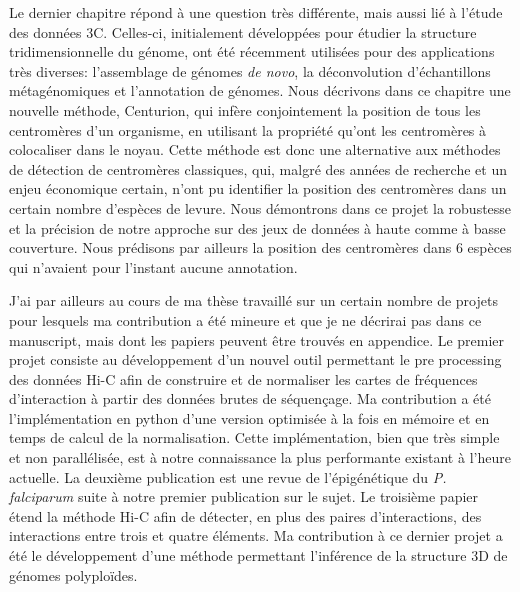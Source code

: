 \begin{resumes}
Le dernier chapitre répond à une question très différente, mais aussi lié à
l'étude des données 3C. Celles-ci, initialement développées pour étudier la
structure tridimensionnelle du génome, ont été récemment utilisées pour des
applications très diverses: l'assemblage de génomes {\em de novo}, la
déconvolution d'échantillons métagénomiques et l'annotation de génomes. Nous
décrivons dans ce chapitre une nouvelle méthode, Centurion, qui infère
conjointement la position de tous les centromères d'un organisme, en utilisant la
propriété qu'ont les centromères à colocaliser dans le noyau. Cette méthode
est donc une alternative aux méthodes de détection de centromères classiques,
qui, malgré des années de recherche et un enjeu économique certain,
n'ont pu identifier la position des
centromères dans un certain nombre d'espèces de levure. Nous démontrons dans ce
projet la robustesse et la précision de notre approche sur des jeux de données
à haute comme à basse couverture. Nous prédisons par ailleurs la position des
centromères dans 6 espèces qui n'avaient pour l'instant aucune annotation.

J'ai par ailleurs au cours de ma thèse travaillé sur un certain nombre de
projets pour lesquels ma contribution a été mineure et que je ne décrirai pas
dans ce manuscript, mais dont les papiers peuvent être trouvés en appendice.
Le premier projet consiste au développement d'un nouvel outil permettant le
pre processing des données Hi-C afin de construire et de normaliser les cartes de fréquences
d'interaction à partir des données brutes de
séquençage. Ma contribution a été l'implémentation en python d'une version
optimisée à la fois en mémoire et en temps de calcul de la normalisation. Cette
implémentation, bien que très simple et non parallélisée, est à
notre connaissance la plus performante existant à l'heure actuelle. La
deuxième publication est une revue de l'épigénétique du {\em P. falciparum} suite à
notre premier publication sur le sujet. Le troisième papier étend la méthode
Hi-C afin de détecter, en plus des paires d'interactions, des interactions
entre trois et quatre éléments. Ma contribution à ce dernier projet a été le
développement d'une méthode permettant l'inférence de la structure 3D de
génomes polyploïdes.

\end{resumes}


